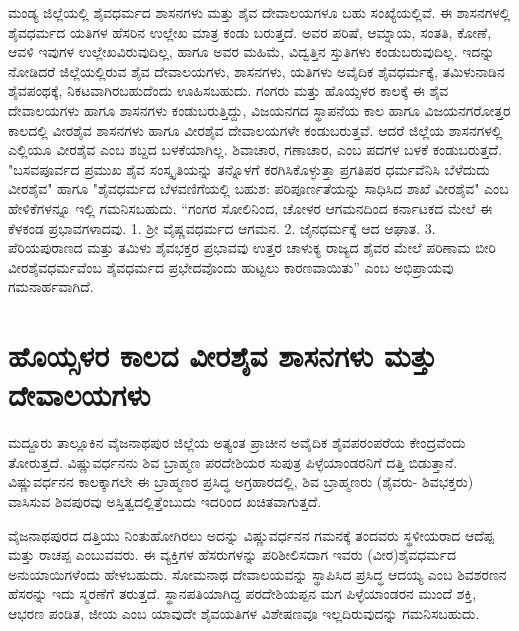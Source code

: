 ಮಂಡ್ಯ ಜಿಲ್ಲೆಯಲ್ಲಿ ಶೈವಧರ್ಮದ ಶಾಸನಗಳು ಮತ್ತು ಶೈವ ದೇವಾಲಯಗಳೂ ಬಹು ಸಂಖ್ಯೆಯಲ್ಲಿವೆ. ಈ ಶಾಸನಗಳಲ್ಲಿ ಶೈವಧರ್ಮದ ಯತಿಗಳ ಹೆಸರಿನ ಉಲ್ಲೇಖ ಮಾತ್ರ ಕಂಡು ಬರುತ್ತದೆ. ಅವರ ಪರಿಷೆ, ಆಮ್ನಾಯ, ಸಂತತಿ, ಕೋಣೆ, ಆವಳಿ ಇವುಗಳ ಉಲ್ಲೇಖವಿರುವುದಿಲ್ಲ, ಹಾಗೂ ಅವರ ಮಹಿಮೆ, ವಿದ್ವತ್ತಿನ ಸ್ತುತಿಗಳು ಕಂಡುಬರುವುದಿಲ್ಲ. ಇದನ್ನು ನೋಡಿದರೆ ಜಿಲ್ಲೆಯಲ್ಲಿರುವ ಶೈವ ದೇವಾಲಯಗಳು, ಶಾಸನಗಳು, ಯತಿಗಳು ಅವೈದಿಕ ಶೈವಧರ್ಮಕ್ಕೆ, ತಮಿಳುನಾಡಿನ ಶೈವಪಂಥಕ್ಕೆ, ನಿಕಟವಾಗಿರಬಹುದೆಂದು ಊಹಿಸಬಹುದು. ಗಂಗರು ಮತ್ತು ಹೊಯ್ಸಳರ ಕಾಲಕ್ಕೆ ಈ ಶೈವ ದೇವಾಲಯಗಳು ಹಾಗೂ ಶಾಸನಗಳು ಕಂಡುಬರುತ್ತಿದ್ದು, ವಿಜಯನಗದ ಸ್ಥಾಪನೆಯ ಕಾಲ ಹಾಗೂ ವಿಜಯನಗರೋತ್ತರ ಕಾಲದಲ್ಲಿ ವೀರಶೈವ ಶಾಸನಗಳು ಹಾಗೂ ವೀರಶೈವ ದೇವಾಲಯಗಳೇ ಕಂಡುಬರುತ್ತವೆ. ಆದರೆ ಜಿಲ್ಲೆಯ ಶಾಸನಗಳಲ್ಲಿ ಎಲ್ಲಿಯೂ ವೀರಶೈವ ಎಂಬ ಶಬ್ದದ ಬಳಕೆಯಾಗಿಲ್ಲ. ಶಿವಾಚಾರ, ಗಣಾಚಾರ, ಎಂಬ ಪದಗಳ ಬಳಕೆ ಕಂಡುಬರುತ್ತದೆ. "ಬಸವಪೂರ್ವದ ಪ್ರಮುಖ ಶೈವ ಸಂಸ್ಕೃತಿಯನ್ನು ತನ್ನೊಳಗೆ ಕರಗಿಸಿಕೊಳ್ಳುತ್ತಾ ಪ್ರಗತಿಪರ ಧರ್ಮವೆನಿಸಿ ಬೆಳೆದುದು ವೀರಶೈವ" ಹಾಗೂ "ಶೈವಧರ್ಮದ ಬೆಳವಣಿಗೆಯಲ್ಲಿ ಬಹುಶ: ಪರಿಪೂರ್ಣತೆಯನ್ನು ಸಾಧಿಸಿದ ಶಾಖೆ ವೀರಶೈವ" ಎಂಬ ಹೇಳಿಕೆಗಳನ್ನೂ ಇಲ್ಲಿ ಗಮನಿಸಬಹುದು. “ಗಂಗರ ಸೋಲಿನಿಂದ, ಚೋಳರ ಆಗಮನದಿಂದ ಕರ್ನಾಟಕದ ಮೇಲೆ ಈ ಕೆಳಕಂಡ ಪ್ರಭಾವಗಳಾದವು. 1. ಶ‍್ರೀ ವೈಷ್ಣವಧರ್ಮದ ಆಗಮನ. 2. ಜೈನಧರ್ಮಕ್ಕೆ ಆದ ಆಘಾತ. 3. ಪೆರಿಯಪುರಾಣದ ಮತ್ತು ತಮಿಳು ಶೈವಭಕ್ತರ ಪ್ರಭಾವವು ಉತ್ತರ ಚಾಳುಕ್ಯ ರಾಜ್ಯದ ಶೈವರ ಮೇಲೆ ಪರಿಣಾಮ ಬೀರಿ ವೀರಶೈವಧರ್ಮವೆಂಬ ಶೈವಧರ್ಮದ ಪ್ರಭೇದವೊಂದು ಹುಟ್ಟಲು ಕಾರಣವಾಯಿತು” ಎಂಬ ಅಭಿಪ್ರಾಯವು ಗಮನಾರ್ಹವಾಗಿದೆ.


\section*{ಹೊಯ್ಸಳರ ಕಾಲದ ವೀರಶೈವ ಶಾಸನಗಳು ಮತ್ತು ದೇವಾಲಯಗಳು}

ಮದ್ದೂರು ತಾಲ್ಲೂಕಿನ ವೈಜನಾಥಪುರ ಜಿಲ್ಲೆಯ ಅತ್ಯಂತ ಪ್ರಾಚೀನ ಅವೈದಿಕ ಶೈವಪರಂಪರೆಯ ಕೇಂದ್ರವೆಂದು ತೋರುತ್ತದೆ. ವಿಷ್ಣುವರ್ಧನನು ಶಿವ ಬ್ರಾಹ್ಮಣ ಪರದೇಶಿಯರ ಸುಪುತ್ರ ಪಿಳ್ಳೆಯಾಂಡರನಿಗೆ ದತ್ತಿ ಬಿಡುತ್ತಾನೆ. ವಿಷ್ಣುವರ್ಧನನ ಕಾಲಕ್ಕಾಗಲೇ ಈ ಬ್ರಾಹ್ಮಣರ ಪ್ರಸಿದ್ಧ ಅಗ್ರಹಾರದಲ್ಲಿ, ಶಿವ ಬ್ರಾಹ್ಮಣರು (ಶೈವರು- ಶಿವಭಕ್ತರು) ವಾಸಿಸುವ ಶಿವಪುರವು ಅಸ್ತಿತ್ವದಲ್ಲಿತ್ತೆಂಬುದು ಇದರಿಂದ ಖಚಿತವಾಗುತ್ತದೆ.

ವೈಜನಾಥಪುರದ ದತ್ತಿಯು ನಿಂತುಹೋಗಿರಲು ಅದನ್ನು ವಿಷ್ಣುವರ್ಧನನ ಗಮನಕ್ಕೆ ತಂದವರು ಸ್ಥಳೀಯರಾದ ಆದೆಪ್ಪ ಮತ್ತು ರಾಚಪ್ಪ ಎಂಬುವವರು. ಈ ವ್ಯಕ್ತಿಗಳ ಹೆಸರುಗಳನ್ನು ಪರಿಶೀಲಿಸದಾಗ ಇವರು (ವೀರ)ಶೈವಧರ್ಮದ ಅನುಯಾಯಿಗಳೆಂದು ಹೇಳಬಹುದು. ಸೋಮನಾಥ ದೇವಾಲಯವನ್ನು ಸ್ಥಾಪಿಸಿದ ಪ್ರಸಿದ್ಧ ಆದಯ್ಯ ಎಂಬ ಶಿವಶರಣನ ಹೆಸರನ್ನು ಇದು ಸ್ಮರಣೆಗೆ ತರುತ್ತದೆ. ಸ್ಥಾನಪತಿಯಾಗಿದ್ದ ಪರದೇಶಿಯಪ್ಪನ ಮಗ ಪಿಳ್ಳೆಯಾಂಡರನ ಮುಂದೆ ಶಕ್ತಿ, ಆಭರಣ ಪಂಡಿತ, ಜೀಯ ಎಂಬ ಯಾವುದೇ ಶೈವಯತಿಗಳ ವಿಶೇಷಣವೂ ಇಲ್ಲದಿರುವುದನ್ನು ಗಮನಿಸಬಹುದು.

